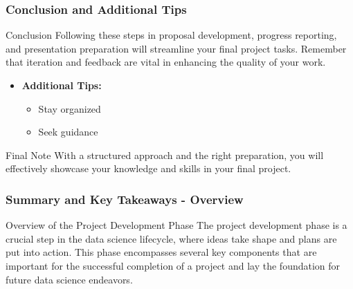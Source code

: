 \documentclass[aspectratio=169]{beamer}
\begin{document}
\begin{frame}[fragile]
    \frametitle{Conclusion and Additional Tips}
    \begin{block}{Conclusion}
        Following these steps in proposal development, progress reporting, and presentation preparation will streamline your final project tasks. Remember that iteration and feedback are vital in enhancing the quality of your work.
    \end{block}
    \begin{itemize}
        \item \textbf{Additional Tips:}
        \begin{itemize}
            \item Stay organized
            \item Seek guidance
        \end{itemize}
    \end{itemize}
    \begin{block}{Final Note}
        With a structured approach and the right preparation, you will effectively showcase your knowledge and skills in your final project.
    \end{block}
\end{frame}

\begin{frame}[fragile]
    \frametitle{Summary and Key Takeaways - Overview}
    \begin{block}{Overview of the Project Development Phase}
        The project development phase is a crucial step in the data science lifecycle, where ideas take shape and plans are put into action. This phase encompasses several key components that are important for the successful completion of a project and lay the foundation for future data science endeavors.
    \end{block}
\end{frame}
\end{document}
